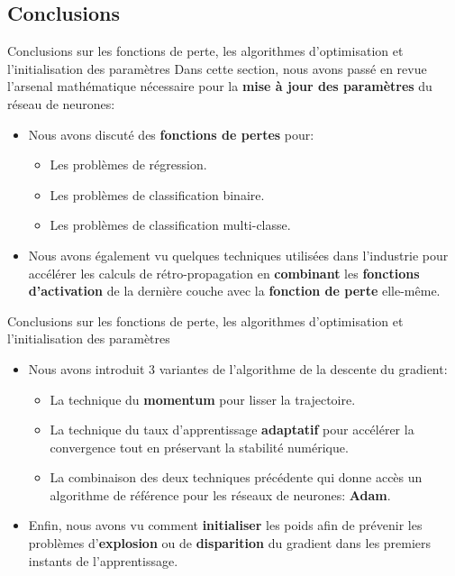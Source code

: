 \subsection[Conclusions]{Conclusions}

\begin{frame}{Conclusions sur les fonctions de perte, les algorithmes d'optimisation et l'initialisation des paramètres}
	Dans cette section, nous avons passé en revue l'arsenal mathématique nécessaire pour la \textbf{mise à jour des paramètres} du réseau de neurones:
	\begin{itemize}
		\item Nous avons discuté des \textbf{fonctions de pertes} pour:
		\begin{itemize}
			\item Les problèmes de régression.
			\item Les problèmes de classification binaire.
			\item Les problèmes de classification multi-classe.
		\end{itemize}
		\item Nous avons également vu quelques techniques utilisées dans l'industrie pour accélérer les calculs de rétro-propagation en \textbf{combinant} les \textbf{fonctions d'activation} de la dernière couche avec la \textbf{fonction de perte} elle-même.
	\end{itemize}
\end{frame}


\begin{frame}{Conclusions sur les fonctions de perte, les algorithmes d'optimisation et l'initialisation des paramètres}
	\begin{itemize}
		\item Nous avons introduit 3 variantes de l'algorithme de la descente du gradient:
		\begin{itemize}
			\item La technique du \textbf{momentum} pour lisser la trajectoire.
			\item La technique du taux d'apprentissage \textbf{adaptatif} pour accélérer la convergence tout en préservant la stabilité numérique.
			\item La combinaison des deux techniques précédente qui donne accès un algorithme de référence pour les réseaux de neurones: \textbf{Adam}.
		\end{itemize}
		\item Enfin, nous avons vu comment \textbf{initialiser} les poids afin de prévenir les problèmes d'\textbf{explosion} ou de \textbf{disparition} du gradient dans les premiers instants de l'apprentissage.
	\end{itemize}
\end{frame}